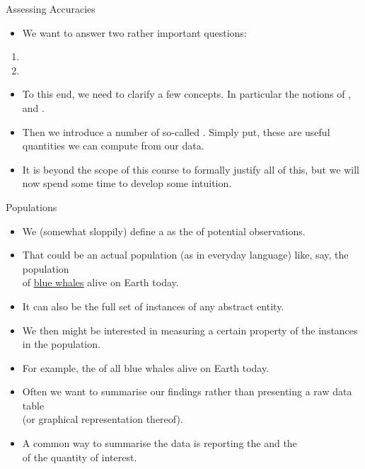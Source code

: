 \documentclass[mathserif, aspectratio=169]{beamer}
\begin{document}
\begin{frame}{Assessing Accuracies}
	\begin{itemize}
		\item We want to  answer two rather important questions: 
	\end{itemize}
	\begin{cpage}
		\begin{enumerate}
			\item {}
			\item {}
		\end{enumerate}
	\end{cpage}
	\begin{itemize}
		\item To this end, we need to clarify a few concepts. In particular the notions of ,
			 and .
		\item Then we introduce a number of so-called . Simply put, these are useful quantities
			we can compute from our data.
		\item It is beyond the scope of this course to formally justify all of this, but we will now
			spend some time to develop some intuition.
	\end{itemize}
\end{frame}

\begin{frame}{Populations}
	\begin{itemize}
		\item We (somewhat sloppily) define a  as the  of potential observations.
		\item That could be an actual population (as in everyday language) like, say, the population\\
			of  \href{https://en.wikipedia.org/wiki/Blue\_whale}{\blue\underline{blue whales}} 
			alive on Earth today.
		\item It can also be the full set of instances of any abstract entity.
		\item We then might be interested in measuring a certain property of the instances in the population.
		\item For example, the  of all blue whales alive on Earth today.
		\item Often we want to summarise our findings rather than presenting a raw data table \\
			(or graphical representation thereof). 
		\item A common way to summarise the data is reporting the  and the\\
			 of the quantity of interest.
	\end{itemize}
\end{frame}
\end{document}
